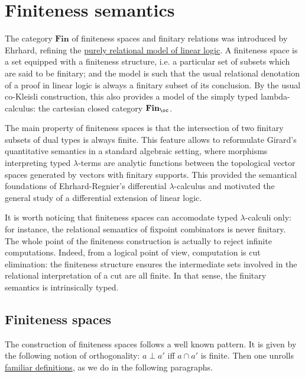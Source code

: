 \section{Finiteness semantics}\label{finiteness-semantics}

The category \(\mathbf{Fin}\) of finiteness spaces and finitary
relations was introduced by Ehrhard, refining the
\href{relational_semantics}{purely relational model of linear logic}. A
finiteness space is a set equipped with a finiteness structure, i.e. a
particular set of subsets which are said to be finitary; and the model
is such that the usual relational denotation of a proof in linear logic
is always a finitary subset of its conclusion. By the usual co-Kleisli
construction, this also provides a model of the simply typed
lambda-calculus: the cartesian closed category \(\mathbf{Fin}_\oc\).

The main property of finiteness spaces is that the intersection of two
finitary subsets of dual types is always finite. This feature allows to
reformulate Girard's quantitative semantics in a standard algebraic
setting, where morphisms interpreting typed \(\lambda\)-terms are
analytic functions between the topological vector spaces generated by
vectors with finitary supports. This provided the semantical foundations
of Ehrhard-Regnier's differential \(\lambda\)-calculus and motivated the
general study of a differential extension of linear logic.

It is worth noticing that finiteness spaces can accomodate typed
\(\lambda\)-calculi only: for instance, the relational semantics of
fixpoint combinators is never finitary. The whole point of the
finiteness construction is actually to reject infinite computations.
Indeed, from a logical point of view, computation is cut elimination:
the finiteness structure ensures the intermediate sets involved in the
relational interpretation of a cut are all finite. In that sense, the
finitary semantics is intrinsically typed.

\subsection{Finiteness spaces}\label{finiteness-spaces}

The construction of finiteness spaces follows a well known pattern. It
is given by the following notion of orthogonality: \(a\mathrel \bot a'\)
iff \(a\cap a'\) is finite. Then one unrolls
\href{Orthogonality_relation}{familiar definitions}, as we do in the
following paragraphs.

